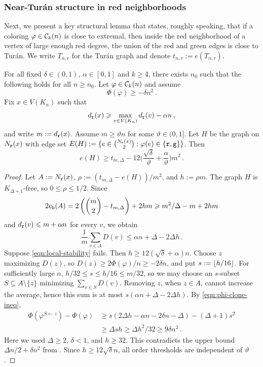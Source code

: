 \subsubsection{Near-Tur\'an structure in red neighborhoods}
Next, we present a key structural lemma that states, roughly speaking, that if a coloring $\varphi\in{\mathcal C}_k(n)$ is close to extremal, then inside the red neighborhood of a vertex of large enough red degree, the union of the red and green edges is close to Tur\'an. We write $T_{n,r}$ for the Tur\'an graph and denote $t_{n,r}:=e(T_{n,r})$.

\begin{lemma}\label{lemma:locally-turan}
For all fixed $\delta\in(0,1)$, $\alpha\in[0,1]$ and $k\geq4$, there exists $n_0$ such that the following holds for all $n\geq n_0$. Let $\varphi\in{\mathcal C}_k(n)$ and assume
$$\Phi(\varphi)\geq-\delta n^2\,.$$
Fix $x\in V(K_n)$ such that
$$d_{\normalfont\texttt r}(x)\geqslant \max_{v\in V(K_n)} d_{\normalfont\texttt r}(v)-\alpha n\,,$$
and write $m:=d_{\normalfont\texttt r}(x)$. Assume $m\geq \vartheta n$ for some $\vartheta\in(0,1]$. Let $H$ be the graph on $N_{\normalfont\texttt r}(x)$ with edge set $E(H):=\{e\in\textstyle\binom{N_{\normalfont\texttt r}(x)}{2}:\varphi(e)\in\{{\normalfont\texttt r},{\normalfont\texttt g}\}\}$. Then
\begin{equation}
e(H)\geq t_{m,\Delta}-12\bigg(\frac{\sqrt{\delta}}{\vartheta}+\frac{\alpha}{\vartheta}\bigg)m^2\,. \label{eqn:local-stability}
\end{equation}
\end{lemma}
\begin{proof}
Let $A:=N_{\normalfont\texttt r}(x)$, $\rho:=(t_{m,\Delta}-e(H))/m^2$, and $h:=\rho m$. The graph $H$ is $K_{\Delta+1}$-free, so $0\leq\rho\leq1/2$. Since
$$2e_{\normalfont\texttt b}(A)=2\left(\binom m2-t_{m,\Delta}\right)+2hm\geqslant m^2/\Delta-m+2hm$$
and $d_{\normalfont\texttt r}(v)\leqslant m+\alpha n$ for every $v$, we obtain
$$\frac1m\sum_{v\in A}D(v)\leq\alpha n+\Delta-2\Delta h\,.$$
Suppose \eqref{eqn:local-stability} fails. Then $h\geq12(\sqrt\delta+\alpha)n$. Choose $z$ maximizing $D(z)$, so $D(z)\geq2\Phi(\varphi)/n\geq-2\delta n$, and put $s:=\lfloor h/16\rfloor$. For sufficiently large $n$, $h/32\leq s\leq h/16\leq m/32$, so we may choose an $s$-subset $S\subseteq A\setminus\{z\}$ minimizing $\sum_{v\in S}D(v)$. Removing $z$, when $z\in A$, cannot increase the average, hence this sum is at most $s(\alpha n+\Delta-2\Delta h)$. By \eqref{eqn:phi-clone-ineq},
\begin{align*}
\Phi(\varphi^{S\gets z})-\Phi(\varphi)&\geq s(2\Delta h-\alpha n-2\delta n-\Delta)-(\Delta+1)s^2\\
&\geq\Delta sh\geq\Delta h^2/32\geq9\delta n^2\,.
\end{align*}
Here we used $\Delta\geq2$, $\delta<1$, and $h\geq32$. This contradicts the upper bound $\Delta n/2+\delta n^2$ from . Since $h\geq12\sqrt\delta n$, all order thresholds are independent of $\vartheta$.
\end{proof}

